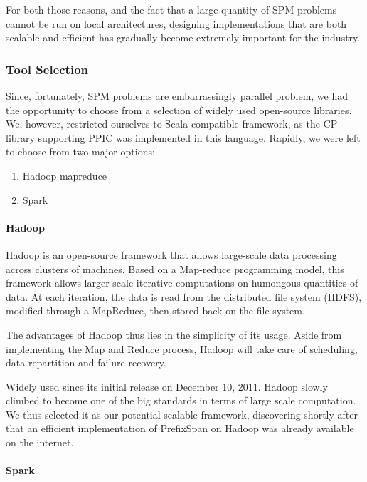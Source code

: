 \documentclass{eplmastersthesis}
\begin{document}
For both those reasons, and the fact that a large quantity of SPM problems cannot be run on local architectures, designing implementations that are both scalable and efficient has gradually become extremely important for the industry.

\subsubsection{Tool Selection}

Since, fortunately, SPM problems are embarrassingly parallel problem, we had the opportunity to choose from a selection of widely used open-source libraries. We, however, restricted ourselves to Scala compatible framework, as the CP library supporting PPIC was implemented in this language. Rapidly, we were left to choose from two major options:

\begin{enumerate}
\item Hadoop mapreduce
\item Spark
\end{enumerate}

\paragraph{Hadoop}

Hadoop is an open-source framework that allows large-scale data processing across clusters of machines. Based on a Map-reduce programming model, this framework allows larger scale iterative computations on humongous quantities of data. At each iteration, the data is read from the distributed file system (HDFS), modified through a MapReduce, then stored back on the file system. \newline

The advantages of Hadoop thus lies in the simplicity of its usage. Aside from implementing the Map and Reduce process, Hadoop will take care of scheduling, data repartition and failure recovery. \newline

Widely used since its initial release on December 10, 2011. Hadoop slowly climbed to become one of the big standards in terms of large scale computation. We thus selected it as our potential scalable framework, discovering shortly after that an efficient implementation of PrefixSpan on Hadoop was already available on the internet.

\paragraph{Spark}
\end{document}
